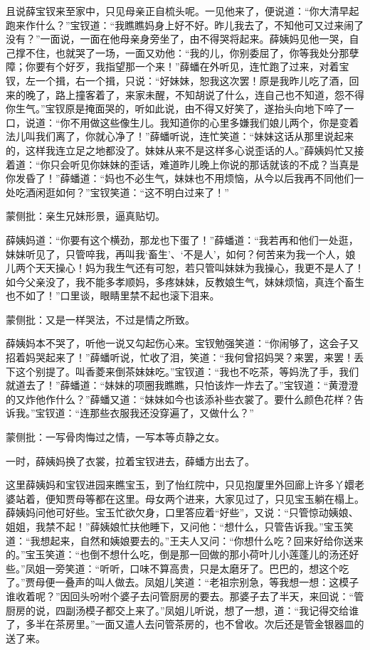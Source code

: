 \begin{parag}
    且说薛宝钗来至家中，只见母亲正自梳头呢。一见他来了，便说道：“你大清早起跑来作什么？”宝钗道：“我瞧瞧妈身上好不好。昨儿我去了，不知他可又过来闹了没有？”一面说，一面在他母亲身旁坐了，由不得哭将起来。薛姨妈见他一哭，自己撑不住，也就哭了一场，一面又劝他：“我的儿，你别委屈了，你等我处分那孽障；你要有个好歹，我指望那一个来！”薛蟠在外听见，连忙跑了过来，对着宝钗，左一个揖，右一个揖，只说：“好妹妹，恕我这次罢！原是我昨儿吃了酒，回来的晚了，路上撞客着了，来家未醒，不知胡说了什么，连自己也不知道，怨不得你生气。”宝钗原是掩面哭的，听如此说，由不得又好笑了，遂抬头向地下啐了一口，说道：“你不用做这些像生儿。我知道你的心里多嫌我们娘儿两个，你是变着法儿叫我们离了，你就心净了！”薛蟠听说，连忙笑道：“妹妹这话从那里说起来的，这样我连立足之地都没了。妹妹从来不是这样多心说歪话的人。”薛姨妈忙又接着道：“你只会听见你妹妹的歪话，难道昨儿晚上你说的那话就该的不成？当真是你发昏了！”薛蟠道：“妈也不必生气，妹妹也不用烦恼，从今以后我再不同他们一处吃酒闲逛如何？”宝钗笑道：“这不明白过来了！”\begin{note}蒙侧批：亲生兄妹形景，逼真贴切。\end{note}薛姨妈道：“你要有这个横劲，那龙也下蛋了！”薛蟠道：“我若再和他们一处逛，妹妹听见了，只管啐我，再叫我‘畜生’、‘不是人’，如何？何苦来为我一个人，娘儿两个天天操心！妈为我生气还有可恕，若只管叫妹妹为我操心，我更不是人了！如今父亲没了，我不能多孝顺妈，多疼妹妹，反教娘生气，妹妹烦恼，真连个畜生也不如了！”口里谈，眼睛里禁不起也滚下泪来。\begin{note}蒙侧批：又是一样哭法，不过是情之所致。\end{note}薛姨妈本不哭了，听他一说又勾起伤心来。宝钗勉强笑道：“你闹够了，这会子又招着妈哭起来了！”薛蟠听说，忙收了泪，笑道：“我何曾招妈哭？来罢，来罢！丢下这个别提了。叫香菱来倒茶妹妹吃。”宝钗道：“我也不吃茶，等妈洗了手，我们就道去了！”薛蟠道：“妹妹的项圈我瞧瞧，只怕该炸一炸去了。”宝钗道：“黄澄澄的又炸他作什么？”薛蟠又道：“妹妹如今也该添补些衣裳了。要什么颜色花样？告诉我。”宝钗道：“连那些衣服我还没穿遍了，又做什么？”\begin{note}蒙侧批：一写骨肉悔过之情，一写本等贞静之女。\end{note}一时，薛姨妈换了衣裳，拉着宝钗进去，薛蟠方出去了。
\end{parag}


\begin{parag}
    这里薛姨妈和宝钗进园来瞧宝玉，到了怡红院中，只见抱厦里外回廊上许多丫嬛老婆站着，便知贾母等都在这里。母女两个进来，大家见过了，只见宝玉躺在榻上。薛姨妈问他可好些。宝玉忙欲欠身，口里答应着“好些”，又说：“只管惊动姨娘、姐姐，我禁不起！”薛姨娘忙扶他睡下，又问他：“想什么，只管告诉我。”宝玉笑道：“我想起来，自然和姨娘要去的。”王夫人又问：“你想什么吃？回来好给你送来的。”宝玉笑道：“也倒不想什么吃，倒是那一回做的那小荷叶儿小莲蓬儿的汤还好些。”凤姐一旁笑道：“听听，口味不算高贵，只是太磨牙了。巴巴的，想这个吃了。”贾母便一叠声的叫人做去。凤姐儿笑道：“老祖宗别急，等我想一想：这模子谁收着呢？”因回头吩咐个婆子去问管厨房的要去。那婆子去了半天，来回说：“管厨房的说，四副汤模子都交上来了。”凤姐儿听说，想了一想，道：“我记得交给谁了，多半在茶房里。”一面又遣人去问管茶房的，也不曾收。次后还是管金银器皿的送了来。
\end{parag}


